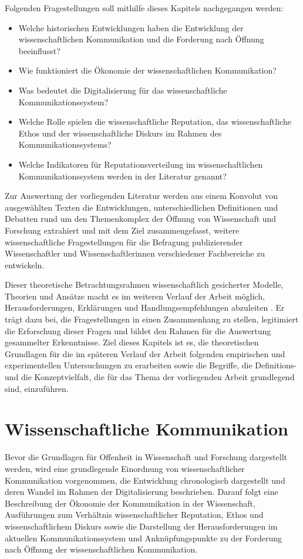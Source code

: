 Folgenden Fragestellungen soll mithilfe dieses Kapitels nachgegangen werden:
\begin{itemize}
\item Welche historischen Entwicklungen haben die Entwicklung der wissenschaftlichen Kommunikation und die Forderung nach Öffnung beeinflusst?
\item Wie funktioniert die Ökonomie der wissenschaftlichen Kommunikation?
\item Was bedeutet die Digitalisierung für das wissenschaftliche Kommunikationssystem?
\item Welche Rolle spielen die wissenschaftliche Reputation, das wissenschaftliche Ethos und der wissenschaftliche Diskurs im Rahmen des Kommunikationssystems?
\item Welche Indikatoren für Reputationsverteilung im wissenschaftlichen Kommunikationssystem werden in der Literatur genannt?
\end{itemize}

Zur Auswertung der vorliegenden Literatur werden aus einem Konvolut von ausgewählten Texten die Entwicklungen, unterschiedlichen Definitionen und Debatten rund um den Themenkomplex der Öffnung von Wissenschaft und Forschung extrahiert und mit dem Ziel zusammengefasst, weitere wissenschaftliche Fragestellungen für die Befragung publizierender Wissenschaftler und Wissenschaftlerinnen verschiedener Fachbereiche zu entwickeln.

Dieser theoretische Betrachtungsrahmen wissenschaftlich gesicherter Modelle, Theorien und Ansätze macht es im weiteren Verlauf der Arbeit möglich, Herausforderungen, Erklärungen und Handlungsempfehlungen abzuleiten \cite{martin_2007_wissenschaftstheorie}. Er trägt dazu bei, die Fragestellungen in einen Zusammenhang zu stellen, legitimiert die Erforschung dieser Fragen und bildet den Rahmen für die Auswertung gesammelter Erkenntnisse. Ziel dieses Kapitels ist es, die theoretischen Grundlagen für die im späteren Verlauf der Arbeit folgenden empirischen und experimentellen Untersuchungen zu erarbeiten sowie die Begriffe, die Definitions- und die Konzeptvielfalt, die für das Thema der vorliegenden Arbeit grundlegend sind, einzuführen.

\section{Wissenschaftliche Kommunikation}

Bevor die Grundlagen für Offenheit in Wissenschaft und Forschung dargestellt werden, wird eine grundlegende Einordnung von wissenschaftlicher Kommunikation vorgenommen, die Entwicklung chronologisch dargestellt und deren Wandel im Rahmen der Digitalisierung beschrieben. Darauf folgt eine Beschreibung der Ökonomie der Kommunikation in der Wissenschaft, Ausführungen zum Verhältnis wissenschaftlicher Reputation, Ethos und wissenschaftlichem Diskurs sowie die Darstellung der Herausforderungen im aktuellen Kommunikationssystem und Anknüpfungspunkte zu der Forderung nach Öffnung der wissenschaftlichen Kommunikation.

